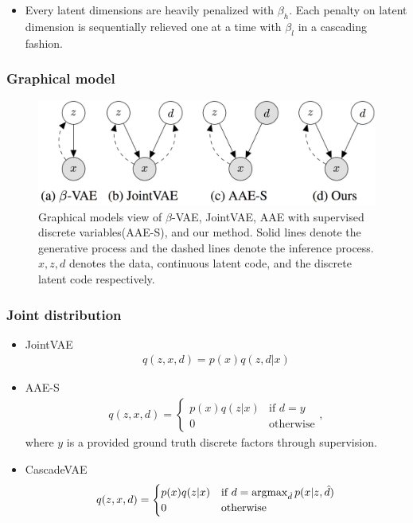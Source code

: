 \documentclass[10pt,mathserif]{beamer}
\begin{document}
\begin{frame}
\begin{figure}
\end{figure}
\begin{itemize}
\item Every latent dimensions are heavily penalized with $\beta_h$. Each penalty on latent dimension is sequentially relieved one at a time with $\beta_l$ in a cascading fashion.
\end{itemize}
\end{frame} 

\begin{frame}
\frametitle{Graphical model}
\begin{figure}[bp]
\centering
\includegraphics[width=1.0\linewidth]{graphical_model.png}
    \caption{Graphical models view of $\beta$-VAE, JointVAE, AAE with supervised discrete variables(AAE-S), and our method. Solid lines denote the generative process and the dashed lines denote the inference process. $x,z,d$ denotes the data, continuous latent code, and the discrete latent code respectively.}
\end{figure}
\end{frame} 

\begin{frame}
\frametitle{Joint distribution}
\begin{itemize}
\item JointVAE
\begin{align}
    q(z,x,d) = p(x)q(z,d|x)\nonumber
\end{align}
\item AAE-S
\begin{align}
    q(z,x,d) = \begin{cases}p(x)q(z|x) & \text{if $d=y$} \\ 0 & \text{otherwise}\end{cases},\nonumber
\end{align}where $y$ is a provided ground truth discrete factors through supervision.
\item CascadeVAE
\begin{align}
    q(z,x,d) = \begin{cases}p(x)q(z|x) & \text{if $d = \mathop{\rm argmax}_{\hat{d}} p(x|z,\hat{d})$} \\0 &\text{otherwise}\end{cases}\nonumber
\end{align}
\end{itemize}
\end{frame}
\end{document}
